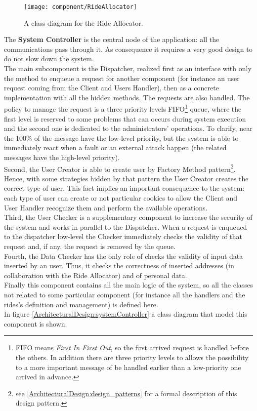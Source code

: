 \documentclass[\mainpath/main]{subfiles}
\begin{document}
\begin{figure}[h!]
	\centering
	\texttt{[image: component/RideAllocator]}
	\caption{A class diagram for the Ride Allocator.}
	\label{ArchitecturalDesign:rideAllocator}
\end{figure}

The \textbf{System Controller} is the central node of the application: all the communications pass through it. As consequence it requires a very good design to do not slow down the system.\\
The main subcomponent is the Dispatcher, realized first as an interface with only the method to enqueue a request for another component (for instance an user request coming from the Client and Users Handler), then as a concrete implementation with all the hidden methods. The requests are also handled. The policy to manage the request is a three priority levels FIFO\footnote{FIFO means \textit{First In First Out}, so the first arrived request is handled before the others. In addition there are three priority levels to allows the possibility to a more important message of be handled earlier than a low-priority one arrived in advance.} queue, where the first level is reserved to some problems that can occurs during system execution and the second one is dedicated to the administrators' operations. To clarify, near the 100\% of the message have the low-level priority, but the system is able to immediately react when a fault or an external attack happen (the related messages have the high-level priority).\\
Second, the User Creator is able to create user by Factory Method pattern\footnote{see \autoref{ArchitecturalDesign:design_patterns} for a formal description of this design pattern.}. Hence, with some strategies hidden by that pattern the User Creator creates the correct type of user. This fact implies an important consequence to the system: each type of user can create or not particular cookies to allow the Client and User Handler recognize them and perform the available operations.\\
Third, the User Checker is a supplementary component to increase the security of the system and works in parallel to the Dispatcher. When a request is enqueued to the dispatcher low-level the Checker immediately checks the validity of that request and, if any, the request is removed by the queue.\\
Fourth, the Data Checker has the only role of checks the validity of input data inserted by an user. Thus, it checks the correctness of inserted addresses (in collaboration with the Ride Allocator) and of personal data.\\
Finally this component contains all the main logic of the system, so all the classes not related to some particular component (for instance all the handlers and the rides's definition and management) is defined here.\\
In figure \ref{ArchitecturalDesign:systemController} a class diagram that model this component is shown.
\end{document}

